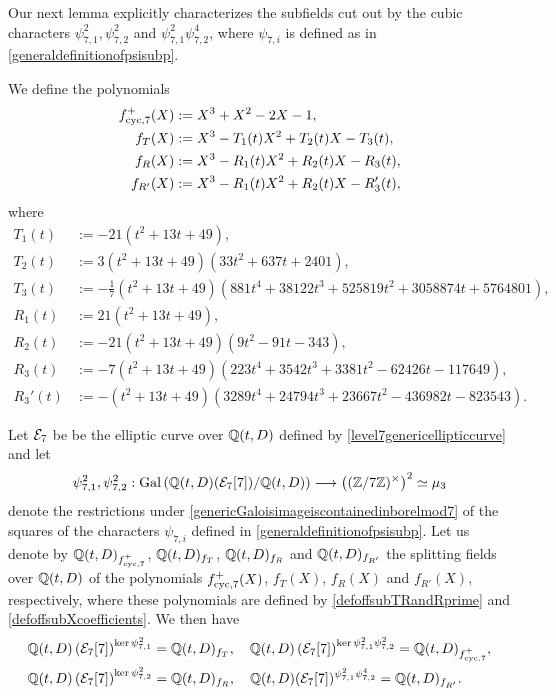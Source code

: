 Our next lemma explicitly characterizes the subfields cut out by the cubic characters $\psi_{7,1}^2, \psi_{7,2}^2$ and $\psi_{7,1}^2\psi_{7,2}^4$, where $\psi_{7,i}$ is defined as in \eqref{generaldefinitionofpsisubp}.

We define the polynomials
\begin{equation} \label{defoffsubTRandRprime}
\begin{split}
f_{\operatorname{cyc},7}^+(X) &:= X^3 + X^2 - 2X - 1, \\
f_T(X) &:= X^3 - T_1(t) X^2 + T_2(t) X - T_3(t), \\
f_R(X) &:= X^3 - R_1(t) X^2 + R_2(t) X - R_3(t), \\
f_{R'}(X) &:= X^3 - R_1(t) X^2 + R_2(t) X - R_3'(t),
\end{split}
\end{equation}
where
\begin{equation} \label{defoffsubXcoefficients}
\begin{split}
T_1(t) &:= -21 ( t^2 + 13t + 49 ), \\
T_2(t) &:= 3 (t^2 + 13t + 49) (33 t^2 + 637t + 2401), \\
T_3(t) &:= -\frac{1}{7} (t^2 + 13t + 49) ( 881 t^4 + 38122 t^3 + 525819 t^2 + 3058874 t + 5764801 ), \\
R_1(t) &:= 21 (t^2 + 13t + 49), \\
R_2(t) &:= -21(t^2 + 13t + 49) (9t^2 - 91 t - 343), \\
R_3(t) &:= -7 (t^2 + 13t + 49) ( 223t^4 + 3542t^3 + 3381t^2 - 62426 t - 117649 ), \\
R_3'(t) &:= - (t^2 + 13t + 49) (3289 t^4 + 24794 t^3 + 23667 t^2 - 436982 t - 823543 ).
\end{split}
\end{equation}
\begin{lemma}
Let $\mathcal{E}_7$ be be the elliptic curve over $\mathbb{Q}(t,D)$ defined by \eqref{level7genericellipticcurve} and let  
\[
\psi_{7,1}^2, \psi_{7,2}^2 : \operatorname{Gal}\left( \mathbb{Q}(t,D)(\mathcal{E}_{7}[7])/\mathbb{Q}(t,D) \right) \longrightarrow \left( (\mathbb{Z}/7\mathbb{Z})^\times \right)^2 \simeq \mu_3
\]
denote the restrictions under \eqref{genericGaloisimageiscontainedinborelmod7} of the squares of the characters $\psi_{7,i}$ defined in \eqref{generaldefinitionofpsisubp}.  Let us denote by $\mathbb{Q}(t,D)_{f_{\operatorname{cyc},7}^+}$, $\mathbb{Q}(t,D)_{f_T}$, $\mathbb{Q}(t,D)_{f_R}$ and $\mathbb{Q}(t,D)_{f_{R'}}$ the splitting fields over $\mathbb{Q}(t,D)$ of the polynomials $f_{\operatorname{cyc},7}^+(X)$, $f_T(X)$, $f_R(X)$ and $f_{R'}(X)$, respectively, where these polynomials are defined by \eqref{defoffsubTRandRprime} and \eqref{defoffsubXcoefficients}.
We then have
\begin{equation} \label{cubicsubfieldsoflevel7lemmaeqn}
\begin{split}
&\mathbb{Q}(t,D)\left( \mathcal{E}_{7}[7] \right)^{\ker \psi_{7,1}^2} = \mathbb{Q}(t,D)_{f_T}, \quad
\mathbb{Q}(t,D)\left( \mathcal{E}_{7}[7] \right)^{\ker \psi_{7,1}^2 \psi_{7,2}^2} = \mathbb{Q}(t,D)_{f_{\operatorname{cyc},7}^+}, \\
&\mathbb{Q}(t,D)\left( \mathcal{E}_{7}[7] \right)^{\ker \psi_{7,2}^2} = \mathbb{Q}(t,D)_{f_R}, \quad \mathbb{Q}(t,D)(\mathcal{E}_{7}[7])^{\psi_{7,1}^2\psi_{7,2}^4} = \mathbb{Q}(t,D)_{f_{R'}}.
\end{split}
\end{equation}
\end{lemma}
